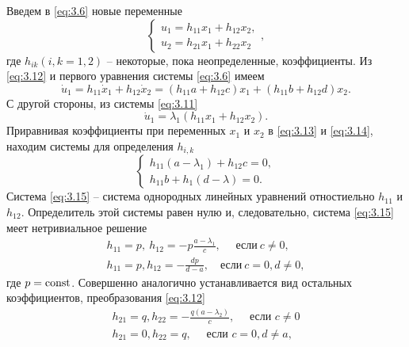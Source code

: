 Введем в \eqref{eq:3.6} новые переменные
\begin{equation}
        \label{eq:3.12}
        \begin{cases}
                u_1= h_{11} x_1 +h_{12} x_2,\\
                u_2=h_{21} x_1 +h_{22} x_2
        \end{cases}
        ,
\end{equation}
где $h_{ik} (i,k= 1,2)$ -- некоторые, пока неопределенные, коэффициенты. Из \eqref{eq:3.12} и первого уравнения системы \eqref{eq:3.6} имеем
\begin{equation}
        \label{eq:3.13}
        \dot u_1 = h_{11} \dot x_1 + h_{12} \dot x_2 = (h_{11} a + h_{12}c) x_1+ (h_{11} b+ h_{12} d) x_2.
\end{equation}
С другой стороны, из системы \eqref{eq:3.11}
\begin{equation}
        \label{eq:3.14}
        \dot u_1 = \lambda_1(h_{11} x_1 + h_{12} x_2).
\end{equation}
Приравнивая коэффициенты при переменных $x_1$ и $x_{2}$ в \eqref{eq:3.13} и \eqref{eq:3.14}, находим системы для определения $h_{i,k}$ 
\begin{equation}
        \label{eq:3.15}
        \begin{cases}
                h_{11}(a - \lambda_1) + h_{12} c=0,\\
                h_{11} b + h_1(d -\lambda) =0.
        \end{cases}
\end{equation}
Система \eqref{eq:3.15} -- система однородных линейных уравнений отностиельно $h_{11}$ и $h_{12}$. Определитель этой системы равен нулю и, следовательно, система \eqref{eq:3.15} меет нетривиальное решение
\begin{equation}
        \label{eq:3.16}
        \begin{gathered}
                h_{11} = p,~h_{12}= - p\frac{a-\lambda_1}{c}, \quad \text{ если}~ c \neq 0, \\
                h_{11}=p, h_{12} = -  \frac{dp}{d-a},\quad \text{если} ~ c=0, d\neq 0,
        \end{gathered}
\end{equation}
где $p= \textrm{const}$. Совершенно аналогично устанавливается вид остальных коэффициентов, преобразования \eqref{eq:3.12}
\begin{equation}
        \label{eq:3.17}
        \begin{gathered}
                h_{21}=q , h_{22} = - \frac{q (a- \lambda_2)}{c}, \quad \text{ если } c\neq 0 \\
                h_{21}=0, h_{22}= q, \quad \text{ если } c=0, d\neq a,
        \end{gathered}
\end{equation}
